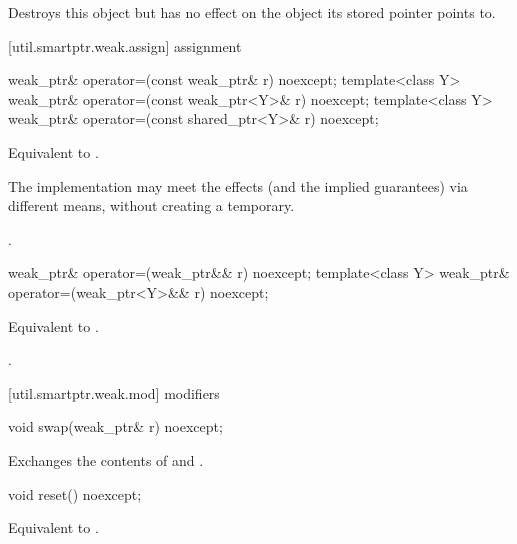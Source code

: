 \begin{itemdescr}
\pnum\effects  Destroys this  object but has no
effect on the object its stored pointer points to.
\end{itemdescr}

[util.smartptr.weak.assign]{ assignment}

%
\begin{itemdecl}
weak_ptr& operator=(const weak_ptr& r) noexcept;
template<class Y> weak_ptr& operator=(const weak_ptr<Y>& r) noexcept;
template<class Y> weak_ptr& operator=(const shared_ptr<Y>& r) noexcept;
\end{itemdecl}

\begin{itemdescr}
\pnum\effects  Equivalent to .

\pnum\remarks  The implementation may meet the effects (and the
implied guarantees) via different means, without creating a temporary.

\pnum\returns  {}.
\end{itemdescr}

%
\begin{itemdecl}
weak_ptr& operator=(weak_ptr&& r) noexcept;
template<class Y> weak_ptr& operator=(weak_ptr<Y>&& r) noexcept;
\end{itemdecl}

\begin{itemdescr}
\pnum\effects  Equivalent to .

\pnum\returns  {}.
\end{itemdescr}

[util.smartptr.weak.mod]{ modifiers}
%
\begin{itemdecl}
void swap(weak_ptr& r) noexcept;
\end{itemdecl}

\begin{itemdescr}
\pnum\effects  Exchanges the contents of  and .
\end{itemdescr}

%
\begin{itemdecl}
void reset() noexcept;
\end{itemdecl}

\begin{itemdescr}
\pnum\effects  Equivalent to .
\end{itemdescr}

